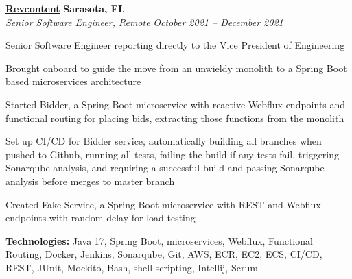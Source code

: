 %
    \headerrow
        {\textbf{\href{https://www.revcontent.com/}{Revcontent}}}
        {\textbf{Sarasota, FL}}
    \\
    \headerrow
        {\emph{Senior Software Engineer, Remote}}
        {\emph{October 2021 -- December 2021}}
    \begin{itemize*}
        \item Senior Software Engineer reporting directly to the Vice President of Engineering
        \item Brought onboard to guide the move from an unwieldy monolith to a Spring Boot based
            microservices architecture
        \item Started Bidder, a Spring Boot microservice with reactive Webflux endpoints and functional
            routing for placing bids, extracting those functions from the monolith
        \item Set up CI/CD for Bidder service, automatically building all branches when pushed to Github,
            running all tests, failing the build if any tests fail, triggering Sonarqube analysis, and requiring
            a successful build and passing Sonarqube analysis before merges to master branch
        \item Created Fake-Service, a Spring Boot microservice with REST and Webflux endpoints with random
            delay for load testing
    \end{itemize*}

    \hspace{1.0em}
        {\textbf{Technologies:} Java 17, Spring Boot, microservices, Webflux, Functional Routing,
        Docker, Jenkins, Sonarqube, Git, AWS, ECR, EC2, ECS, CI/CD, REST, JUnit, Mockito, Bash, shell scripting, Intellij, Scrum}

